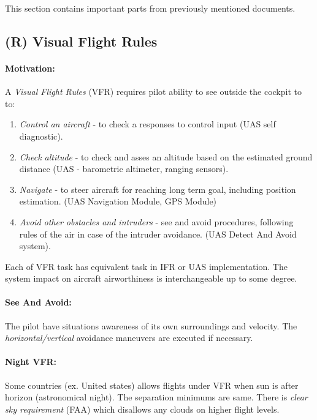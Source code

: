\begin{note}
    This section contains important parts from previously mentioned documents. 
\end{note}

\subsection{(R) Visual Flight Rules}\label{sec:VisualFlightRules}
\paragraph{Motivation:} A \emph{Visual Flight Rules} (VFR) requires pilot ability to see outside the cockpit to to:

\begin{enumerate}
    \item \emph{Control an aircraft} - to check a responses to control input (UAS self diagnostic).
    
    \item \emph{Check altitude} - to check and asses an altitude based on the estimated ground distance (UAS - barometric altimeter, ranging sensors).
    
    \item \emph{Navigate} - to steer aircraft for reaching long term goal, including position estimation. (UAS Navigation Module, GPS Module)
    
    \item \emph{Avoid other obstacles and intruders} - see and avoid procedures, following rules of the air in case of the intruder avoidance. (UAS Detect And Avoid system).
\end{enumerate}

\begin{note}
    Each of VFR task has equivalent task in IFR or UAS implementation. The system impact on aircraft airworthiness is interchangeable up to some degree.
\end{note}

\paragraph{See And Avoid:} The pilot have situations awareness of its own surroundings and velocity. The \emph{horizontal/vertical} avoidance maneuvers are executed if necessary. 

\paragraph{Night VFR:} Some countries (ex. United states) allows flights under VFR when sun is after horizon (astronomical night). The separation minimums are same. There is \emph{clear sky requirement} (FAA) which disallows any clouds on higher flight levels.



